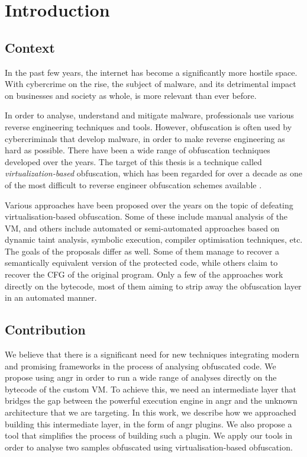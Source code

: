 \chapter{Introduction}

\section{Context}

In the past few years, the internet has become a significantly more hostile space. With cybercrime on the rise, the subject of malware, and its detrimental impact on businesses and society as whole, is more relevant than ever before. 

In order to analyse, understand and mitigate malware, professionals use various reverse engineering techniques and tools. However, obfuscation is often used by cybercriminals that develop malware, in order to make reverse engineering as hard as possible. There have been a wide range of obfuscation techniques developed over the years. The target of this thesis is a technique called \emph{virtualization-based} obfuscation, which has been regarded for over a decade as one of the most difficult to reverse engineer obfuscation schemes available \cite{dang2014practical}.

Various approaches have been proposed over the years on the topic of defeating virtualisation-based obfuscation. Some of these include manual analysis of the \gls{VM}, and others include automated or semi-automated approaches based on dynamic taint analysis, symbolic execution, compiler optimisation techniques, etc. The goals of the proposals differ as well. Some of them manage to recover a semantically equivalent version of the protected code, while others claim to recover the \gls{CFG} of the original program. Only a few of the approaches work directly on the bytecode, most of them aiming to strip away the obfuscation layer in an automated manner.

\section{Contribution}

We believe that there is a significant need for new techniques integrating modern and promising frameworks in the process of analysing obfuscated code. We propose using angr in order to run a wide range of analyses directly on the bytecode of the custom \gls{VM}. To achieve this, we need an intermediate layer that bridges the gap between the powerful execution engine in angr and the unknown architecture that we are targeting. In this work, we describe how we approached building this intermediate layer, in the form of angr plugins. We also propose a tool that simplifies the process of building such a plugin. We apply our tools in order to analyse two samples obfuscated using virtualisation-based obfuscation.

